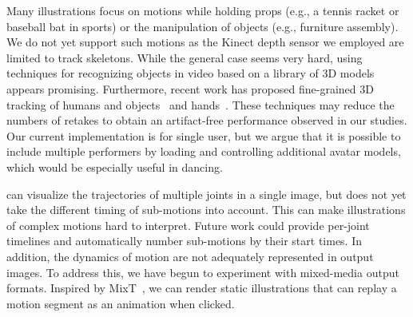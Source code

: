  Many illustrations focus on motions while holding props (e.g., a tennis racket or baseball bat in sports) or the manipulation of objects (e.g., furniture assembly).
%
We do not yet support such motions as the Kinect depth sensor we employed are limited to track skeletons. While the general case seems very hard, using techniques for recognizing objects in video based on a library of 3D models~\cite{kholgade20143d} appears promising. Furthermore, recent work has proposed fine-grained 3D tracking of humans and objects~\cite{dou-siggraph2016} and hands~\cite{taylor-siggraph2016}. %
%
These techniques may reduce the numbers of retakes to obtain an artifact-free performance observed in our studies.
%
Our current implementation is for single user, but we argue that it is possible to include multiple performers by loading and controlling additional avatar models, which would be especially useful in dancing.

 \systemname{} can visualize the trajectories of multiple joints in a single image, but does not yet take the different timing of sub-motions into account. This can make illustrations of complex motions hard to interpret. Future work could provide per-joint timelines and automatically number sub-motions by their start times. In addition, the dynamics of motion are not adequately represented in output images. To address this, we have begun to experiment with mixed-media output formats. Inspired by MixT~\cite{Chi:2012:MAG:2380116.2380130}, we can render static illustrations that can replay a motion segment as an animation when clicked.
